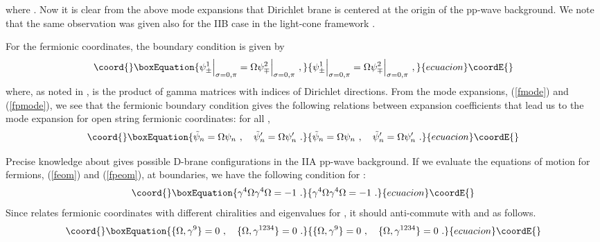 \documentclass[a4paper,12pt]{article}
\begin{document}
where \coordHE{}.  Now it is clear from the above
mode expansions that Dirichlet brane is centered at the origin of the
pp-wave background.  We note that the same observation was given also
for the IIB case in the light-cone framework \cite{dab231}.

For the fermionic coordinates, the boundary condition is given by
\begin{equation}\coord{}\boxEquation{
\psi^1_\pm \Big|_{\sigma=0,\pi} 
 = \Omega \psi^2_\mp \Big|_{\sigma=0,\pi} ~,
\label{fbc}
}{
\psi^1_\pm \Big|_{\sigma=0,\pi} 
 = \Omega \psi^2_\mp \Big|_{\sigma=0,\pi} ~,
}{ecuacion}\coordE{}\end{equation}
where, as noted in \cite{dab231}, \myHighlight{$\Omega$}\coordHE{} is the product of gamma
matrices with indices of Dirichlet directions.  From the mode
expansions, (\ref{fmode}) and (\ref{fpmode}), we see that the
fermionic boundary condition gives the following relations between
expansion coefficients that lead us to the mode expansion for open
string fermionic coordinates: for all \coordHE{},
\begin{equation}\coord{}\boxEquation{
\tilde{\psi}_n = \Omega \psi_n ~,~~~
\tilde{\psi}'_n = \Omega \psi'_n ~.
\label{fmbc}
}{
\tilde{\psi}_n = \Omega \psi_n ~,~~~
\tilde{\psi}'_n = \Omega \psi'_n ~.
}{ecuacion}\coordE{}\end{equation}

Precise knowledge about \myHighlight{$\Omega$}\coordHE{} gives possible D-brane configurations
in the IIA pp-wave background.  If we evaluate the equations of motion
for fermions, (\ref{feom}) and (\ref{fpeom}), at boundaries, we have
the following condition for \myHighlight{$\Omega$}\coordHE{}:
\begin{equation}\coord{}\boxEquation{
\gamma^4 \Omega \gamma^4 \Omega = -1 ~.
\label{oc}
}{
\gamma^4 \Omega \gamma^4 \Omega = -1 ~.
}{ecuacion}\coordE{}\end{equation}
Since \myHighlight{$\Omega$}\coordHE{} relates fermionic coordinates with different \coordHE{}
chiralities and eigenvalues for \coordHE{}, it should
anti-commute with \coordHE{} and \coordHE{} as follows.
\begin{equation}\coord{}\boxEquation{
\{ \Omega, \gamma^9 \} = 0 ~, ~~~
\{ \Omega, \gamma^{1234} \} = 0 ~.
\label{og}
}{
\{ \Omega, \gamma^9 \} = 0 ~, ~~~
\{ \Omega, \gamma^{1234} \} = 0 ~.
}{ecuacion}\coordE{}\end{equation}
\end{document}
